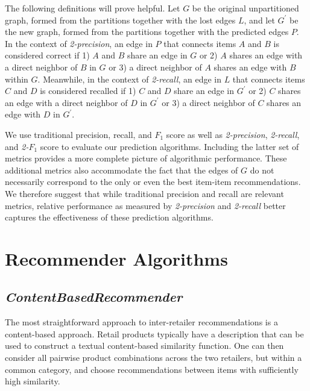 \documentclass[11pt]{article}
\begin{document}
The following definitions will prove helpful. Let $G$ be the original
unpartitioned graph, formed from the partitions together with the lost edges
$L$, and let $G^{\prime}$ be the new graph, formed from the partitions together
with the predicted edges $P$.  In the context of {\em 2-precision}, an edge in
$P$ that connects items $A$ and $B$ is considered correct if 1) $A$ and $B$
share an edge in $G$ or 2) $A$ shares an edge with a direct neighbor of $B$ in
$G$ or 3) a direct neighbor of $A$ shares an edge with $B$ within $G$.
Meanwhile, in the context of {\em 2-recall}, an edge in $L$ that connects items
$C$ and $D$ is considered recalled if 1) $C$ and $D$ share an edge in
$G^{\prime}$ or 2) $C$ shares an edge with a direct neighbor of $D$ in
$G^{\prime}$ or 3) a direct neighbor of $C$ shares an edge with $D$ in
$G^{\prime}$.

We use traditional precision, recall, and $F_1$ score as well as {\em
2-precision}, {\em 2-recall}, and {\em 2-}$F_1$ score to evaluate our prediction
algorithms. Including the latter set of metrics provides a more complete picture
of algorithmic performance. These additional metrics also accommodate the fact
that the edges of $G$ do not necessarily correspond to the only or even the best
item-item recommendations. We therefore suggest that while traditional precision
and recall are relevant metrics, relative performance as measured by {\em
2-precision} and {\em 2-recall} better captures the effectiveness of these
prediction algorithms.

\section*{Recommender Algorithms}

\subsection*{\em ContentBasedRecommender}
The most straightforward approach to inter-retailer recommendations is a
content-based approach. Retail products typically have a description that can be
used to construct a textual content-based similarity function. One can then
consider all pairwise product combinations across the two retailers, but within
a common category, and choose recommendations between items with sufficiently
high similarity.
\end{document}
